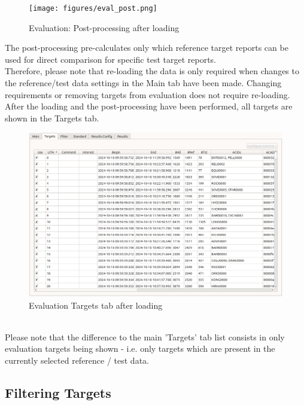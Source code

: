 \begin{figure}[H]
  \centering 
    \texttt{[image: figures/eval\_post.png]}
  \caption{Evaluation: Post-processing after loading}
\end{figure}

The post-processing pre-calculates only which reference target reports can be used for direct comparison for specific test target reports. \\

Therefore, please note that re-loading the data is only required when changes to the reference/test data settings in the Main tab have been made. Changing requirements or removing targets from evaluation does not require re-loading. \\

After the loading and the post-processing have been performed, all targets are shown in the Targets tab.

\begin{figure}[H]
  \hspace*{-2cm}
    \includegraphics[width=18cm,frame]{figures/eval_targets_loaded.png}
  \caption{Evaluation Targets tab after loading}
\end{figure}
\ \\

Please note that the difference to the main 'Targets' tab list consists in only evaluation targets being shown - i.e. only targets which are present in the currently selected reference / test data.

\subsection{Filtering Targets}
\label{sec:eval_filter_targets} 

